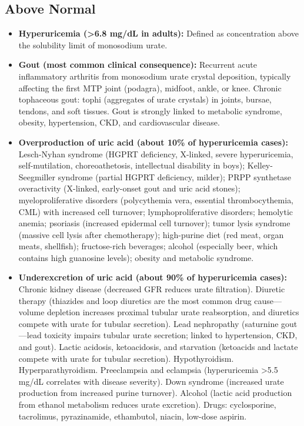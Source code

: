 \subsection*{Above Normal}
\begin{itemize}
  \item \textbf{Hyperuricemia (>6.8 mg/dL in adults):} Defined as concentration above the solubility limit of monosodium urate.
  \item \textbf{Gout (most common clinical consequence):} Recurrent acute inflammatory arthritis from monosodium urate crystal deposition, typically affecting the first MTP joint (podagra), midfoot, ankle, or knee. Chronic tophaceous gout: tophi (aggregates of urate crystals) in joints, bursae, tendons, and soft tissues. Gout is strongly linked to metabolic syndrome, obesity, hypertension, CKD, and cardiovascular disease.
  \item \textbf{Overproduction of uric acid (about 10\% of hyperuricemia cases):} Lesch-Nyhan syndrome (HGPRT deficiency, X-linked, severe hyperuricemia, self-mutilation, choreoathetosis, intellectual disability in boys); Kelley-Seegmiller syndrome (partial HGPRT deficiency, milder); PRPP synthetase overactivity (X-linked, early-onset gout and uric acid stones); myeloproliferative disorders (polycythemia vera, essential thrombocythemia, CML) with increased cell turnover; lymphoproliferative disorders; hemolytic anemia; psoriasis (increased epidermal cell turnover); tumor lysis syndrome (massive cell lysis after chemotherapy); high-purine diet (red meat, organ meats, shellfish); fructose-rich beverages; alcohol (especially beer, which contains high guanosine levels); obesity and metabolic syndrome.
  \item \textbf{Underexcretion of uric acid (about 90\% of hyperuricemia cases):} Chronic kidney disease (decreased GFR reduces urate filtration). Diuretic therapy (thiazides and loop diuretics are the most common drug cause---volume depletion increases proximal tubular urate reabsorption, and diuretics compete with urate for tubular secretion). Lead nephropathy (saturnine gout---lead toxicity impairs tubular urate secretion; linked to hypertension, CKD, and gout). Lactic acidosis, ketoacidosis, and starvation (ketoacids and lactate compete with urate for tubular secretion). Hypothyroidism. Hyperparathyroidism. Preeclampsia and eclampsia (hyperuricemia >5.5 mg/dL correlates with disease severity). Down syndrome (increased urate production from increased purine turnover). Alcohol (lactic acid production from ethanol metabolism reduces urate excretion). Drugs: cyclosporine, tacrolimus, pyrazinamide, ethambutol, niacin, low-dose aspirin.

\end{itemize}
